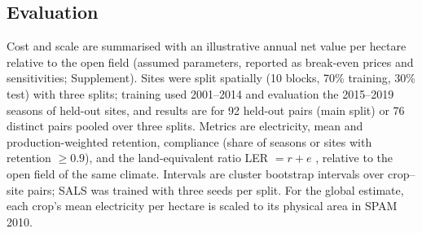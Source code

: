 \subsection{Evaluation}\label{sec:m-eval}
Cost and scale are summarised with an illustrative annual net value per hectare relative to the open field (assumed parameters, reported as break-even prices and sensitivities; Supplement). Sites were split spatially (10\textdegree{} blocks, 70\% training, 30\% test) with three splits; training used 2001--2014 and evaluation the 2015--2019 seasons of held-out sites, and results are for 92 held-out pairs (main split) or 76 distinct pairs pooled over three splits. Metrics are electricity, mean and production-weighted retention, compliance (share of seasons or sites with retention $\ge0.9$), and the land-equivalent ratio LER $=r+e$ \citep{dupraz2011}, relative to the open field of the same climate. Intervals are cluster bootstrap intervals over crop--site pairs; SALS was trained with three seeds per split. For the global estimate, each crop's mean electricity per hectare is scaled to its physical area in SPAM 2010.
